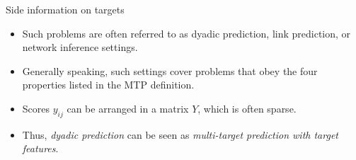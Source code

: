 \begin{vbframe}{Side information on targets}
\begin{itemize}
\begin{itemize}
\begin{minipage}{0.4\textwidth}
\begin{center}
				\\ Waegeman et al. (2019), Multi-target prediction:
				A unifying view on problems and methods (\href{https://arxiv.org/pdf/1809.02352.pdf}{\underline{URL}}).
			\end{center}
		\end{minipage}
		\end{itemize}
		\footnotesize
		\item Such problems are often referred to as dyadic prediction, link prediction, or network inference settings.
		\item Generally speaking, such settings cover problems that obey the four properties listed in the MTP definition. 
		\item Scores $y_{ij}$ can be arranged in a matrix $Y$, which is often sparse. 
		\item Thus, \emph{dyadic prediction} can be seen as \emph{multi-target prediction with target features}. 
	\end{itemize}
\end{vbframe}






